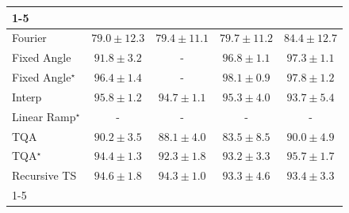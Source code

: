 \begin{tabular}{l|cccc|}
\cline{1-5}
\multicolumn{5}{c}{\rule{0pt}{8pt}SV} \\
\midrule
Fourier & {\cellcolor[HTML]{F0EAF4}} \color[HTML]{000000} $79.0\pm 12.3$ & {\cellcolor[HTML]{EDE8F3}} \color[HTML]{000000} $79.4\pm 11.1$ & {\cellcolor[HTML]{EAE6F1}} \color[HTML]{000000} $79.7\pm 11.2$ & {\cellcolor[HTML]{ADC1DD}} \color[HTML]{000000} $84.4\pm 12.7$ \\
Fixed Angle & {\cellcolor[HTML]{1B7EB7}} \color[HTML]{F1F1F1} $91.8\pm 3.2$ & {\cellcolor[HTML]{000000}} \color[HTML]{F1F1F1} {\cellcolor{white}} \color{black} - & {\cellcolor[HTML]{034B76}} \color[HTML]{F1F1F1} $96.8\pm 1.1$ & {\cellcolor[HTML]{03466E}} \color[HTML]{F1F1F1} $97.3\pm 1.1$ \\
Fixed Angle$^\star$ & {\cellcolor[HTML]{03517E}} \color[HTML]{F1F1F1} $96.4\pm 1.4$ & {\cellcolor[HTML]{000000}} \color[HTML]{F1F1F1} {\cellcolor{white}} \color{black} - & {\cellcolor[HTML]{023B5D}} \color[HTML]{F1F1F1} $98.1\pm 0.9$ & {\cellcolor[HTML]{023F64}} \color[HTML]{F1F1F1} $97.8\pm 1.2$ \\
Interp & {\cellcolor[HTML]{04588A}} \color[HTML]{F1F1F1} $95.8\pm 1.2$ & {\cellcolor[HTML]{046299}} \color[HTML]{F1F1F1} $94.7\pm 1.1$ & {\cellcolor[HTML]{045D92}} \color[HTML]{F1F1F1} $95.3\pm 4.0$ & {\cellcolor[HTML]{056AA6}} \color[HTML]{F1F1F1} $93.7\pm 5.4$ \\
Linear Ramp$^\star$ & {\cellcolor[HTML]{000000}} \color[HTML]{F1F1F1} {\cellcolor{white}} \color{black} - & {\cellcolor[HTML]{000000}} \color[HTML]{F1F1F1} {\cellcolor{white}} \color{black} - & {\cellcolor[HTML]{000000}} \color[HTML]{F1F1F1} {\cellcolor{white}} \color{black} - & {\cellcolor[HTML]{000000}} \color[HTML]{F1F1F1} {\cellcolor{white}} \color{black} - \\
TQA & {\cellcolor[HTML]{3991C1}} \color[HTML]{F1F1F1} $90.2\pm 3.5$ & {\cellcolor[HTML]{69A5CC}} \color[HTML]{F1F1F1} $88.1\pm 4.0$ & {\cellcolor[HTML]{BCC7E1}} \color[HTML]{000000} $83.5\pm 8.5$ & {\cellcolor[HTML]{3D93C2}} \color[HTML]{F1F1F1} $90.0\pm 4.9$ \\
TQA$^\star$ & {\cellcolor[HTML]{04649E}} \color[HTML]{F1F1F1} $94.4\pm 1.3$ & {\cellcolor[HTML]{1278B4}} \color[HTML]{F1F1F1} $92.3\pm 1.8$ & {\cellcolor[HTML]{056EAD}} \color[HTML]{F1F1F1} $93.2\pm 3.3$ & {\cellcolor[HTML]{045A8D}} \color[HTML]{F1F1F1} $95.7\pm 1.7$ \\
Recursive TS & {\cellcolor[HTML]{04639B}} \color[HTML]{F1F1F1} $94.6\pm 1.8$ & {\cellcolor[HTML]{05659F}} \color[HTML]{F1F1F1} $94.3\pm 1.0$ & {\cellcolor[HTML]{056DAC}} \color[HTML]{F1F1F1} $93.3\pm 4.6$ & {\cellcolor[HTML]{056DAB}} \color[HTML]{F1F1F1} $93.4\pm 3.3$ \\
\cline{1-5}
\bottomrule
\end{tabular}
